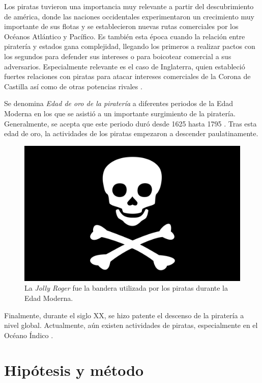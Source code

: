 \documentclass{article}
\begin{document}
Los piratas tuvieron una importancia muy relevante a partir del descubrimiento de américa, donde las naciones occidentales experimentaron un crecimiento muy importante de sus flotas y se establecieron nuevas rutas comerciales por los Océanos Atlántico y Pacífico. Es también esta época cuando la relación entre piratería y estados gana complejidad, llegando los primeros a realizar pactos con los segundos para defender sus intereses o para boicotear comercial a sus adversarios. Especialmente relevante es el caso de Inglaterra, quien estableció fuertes relaciones con piratas para atacar intereses comerciales de la Corona de Castilla así como de otras potencias rivales \cite{hebb2016}.

Se denomina \emph{Edad de oro de la piratería} a diferentes periodos de la Edad Moderna en los que se asistió a un importante surgimiento de la piratería. Generalmente, se acepta que este periodo duró desde 1625 hasta 1795 \cite{little2010}. Tras esta edad de oro, la actividades de los piratas empezaron a descender paulatinamente. 


\begin{figure}[h]
    \includegraphics[width=12cm]{jolly_roger.png}
    \caption{La \emph{Jolly Roger} fue la bandera utilizada por los piratas durante la Edad Moderna.}
    \centering
\end{figure}

Finalmente, durante el siglo XX, se hizo patente el descenso de la piratería a nivel global. Actualmente, aún existen actividades de piratas, especialmente en el Océano Índico \cite{gomez2013}.

\section{Hipótesis y método}
\end{document}
